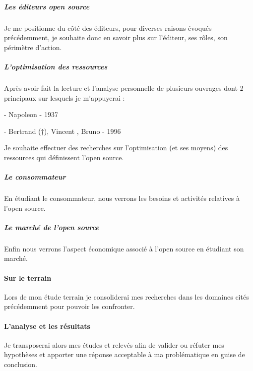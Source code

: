 			\subparagraph{Les éditeurs open source\\}

				Je me positionne du côté des éditeurs, pour diverses raisons évoqués précédemment, je souhaite donc en savoir plus sur l'éditeur, ses rôles, son périmètre d'action.

			\subparagraph{L'optimisation des ressources\\}
		
				Après avoir fait la lecture et l'analyse personnelle de plusieurs ouvrages dont 2 principaux sur lesquels je m'appuyerai : 
		
				\begin{displayquote}
					 - Napoleon  - 1937
				\end{displayquote}
				\begin{displayquote}
					 - Bertrand  (†), Vincent , Bruno \bsc{Jarrosson} - 1996
				\end{displayquote}
		
				Je souhaite effectuer des recherches sur l'optimisation (et ses moyens) des ressources qui définissent l'open source.

			\subparagraph{Le consommateur\\}
				En étudiant le consommateur, nous verrons les besoins et activités relatives à l'open source.

			\subparagraph{Le marché de l'open source\\}
				Enfin nous verrons l'aspect économique associé à l'open source en étudiant son marché.

		\paragraph{Sur le terrain \\}
			Lors de mon étude terrain je consoliderai mes recherches dans les domaines cités précédemment pour pouvoir les confronter.

		\paragraph{L'analyse et les résultats \\}
			Je transposerai alors mes études et relevés afin de valider ou réfuter mes hypothèses et apporter une réponse acceptable à ma problématique en guise de conclusion.